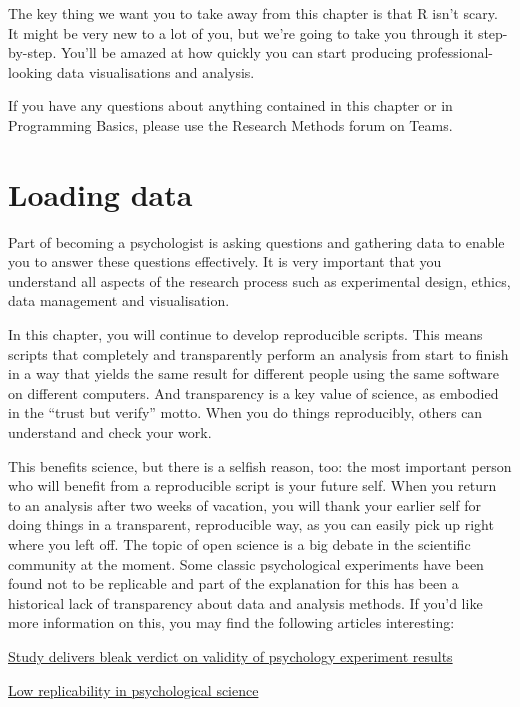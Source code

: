 \documentclass[]{book}
\begin{document}
The key thing we want you to take away from this chapter is that R isn't scary. It might be very new to a lot of you, but we're going to take you through it step-by-step. You'll be amazed at how quickly you can start producing professional-looking data visualisations and analysis.

If you have any questions about anything contained in this chapter or in Programming Basics, please use the Research Methods forum on Teams.

\hypertarget{loading-data}{%
\chapter{Loading data}\label{loading-data}}

Part of becoming a psychologist is asking questions and gathering data to enable you to answer these questions effectively. It is very important that you understand all aspects of the research process such as experimental design, ethics, data management and visualisation.

In this chapter, you will continue to develop reproducible scripts. This means scripts that completely and transparently perform an analysis from start to finish in a way that yields the same result for different people using the same software on different computers. And transparency is a key value of science, as embodied in the ``trust but verify'' motto. When you do things reproducibly, others can understand and check your work.

This benefits science, but there is a selfish reason, too: the most important person who will benefit from a reproducible script is your future self. When you return to an analysis after two weeks of vacation, you will thank your earlier self for doing things in a transparent, reproducible way, as you can easily pick up right where you left off. The topic of open science is a big debate in the scientific community at the moment. Some classic psychological experiments have been found not to be replicable and part of the explanation for this has been a historical lack of transparency about data and analysis methods. If you'd like more information on this, you may find the following articles interesting:

\href{https://www.theguardian.com/science/2015/aug/27/study-delivers-bleak-verdict-on-validity-of-psychology-experiment-results}{Study delivers bleak verdict on validity of psychology experiment results}

\href{http://www.apa.org/science/about/psa/2015/09/low-replicability.aspx}{Low replicability in psychological science}
\end{document}
